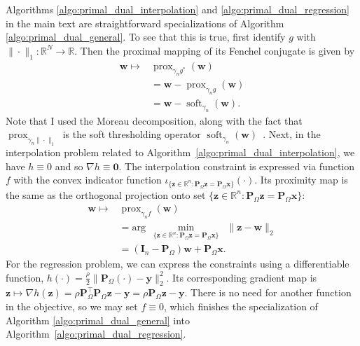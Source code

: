 Algorithms \ref{algo:primal_dual_interpolation} and \ref{algo:primal_dual_regression} in the main text are straightforward specializations of Algorithm \ref{algo:primal_dual_general}. To see that this is true, first identify $g$ with $\|\cdot\|_1 : \mathbb{R}^{N} \to \mathbb{R}$. Then the proximal mapping of its Fenchel conjugate is given by
\begin{align*}
    \mathbf{w} \mapsto & \operatorname{prox}_{\gamma_n g^*} \left ( \mathbf{w} \right ) \\
    & = \mathbf{w} - \operatorname{prox}_{\gamma_n g} \left ( \mathbf{w} \right ) \\
    & = \mathbf{w} - \operatorname{soft}_{\gamma_n} (\mathbf{w}).
\end{align*}
Note that I used the Moreau decomposition, along with the fact that $\operatorname{prox}_{\gamma_n \|\cdot\|_1}$ is the soft thresholding operator $\operatorname{soft}_{\gamma_n} (\mathbf{w})$~\cite[Table 2, entry ii]{combettes2011}. Next, in the interpolation problem related to Algorithm~\ref{algo:primal_dual_interpolation}, we have $h \equiv 0$ and so $\nabla h \equiv \mathbf{0}$. The interpolation constraint is expressed via function $f$ with the convex indicator function $\iota_{\{\mathbf{z} \in \mathbb{R}^{n} : \mathbf{P}_{\Omega}\mathbf{z} = \mathbf{P}_{\Omega}\mathbf{x}\}}(\cdot)$. Its proximity map is the same as the orthogonal projection onto set $\{\mathbf{z} \in \mathbb{R}^{n} : \mathbf{P}_{\Omega}\mathbf{z} = \mathbf{P}_{\Omega}\mathbf{x}\}$:
\begin{align*}
    \mathbf{w} \mapsto & \operatorname{prox}_{\gamma_n f} \left ( \mathbf{w} \right ) \\
    & = \text{arg} \enspace \underset{\{ \mathbf{z} \in \mathbb{R}^{n} : \mathbf{P}_{\Omega} \mathbf{z} = \mathbf{P}_{\Omega} \mathbf{x} \}}{\min} \enspace \|\mathbf{z} - \mathbf{w}\|_2 \\
    & = (\mathbf{I}_n - \mathbf{P}_{\Omega}) \mathbf{w} + \mathbf{P}_{\Omega}\mathbf{x}.
\end{align*}
For the regression problem, we can express the constraints using a differentiable function, $h(\cdot) = \frac{\rho}{2} \| \mathbf{P}_{\Omega}(\cdot) - \mathbf{y}\|_2^2$. Its corresponding gradient map is $\mathbf{z} \mapsto \nabla h (\mathbf{z}) = \rho \mathbf{P}_{\Omega}^\top \mathbf{P}_{\Omega}\mathbf{z} - \mathbf{y} = \rho \mathbf{P}_{\Omega}\mathbf{z} - \mathbf{y}$. There is no need for another function in the objective, so we may set $f \equiv 0$, which finishes the specialization of Algorithm \ref{algo:primal_dual_general} into Algorithm~\ref{algo:primal_dual_regression}.
